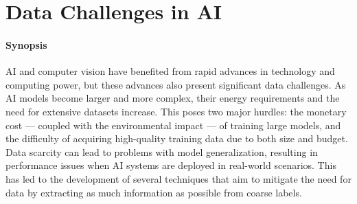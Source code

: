 \graphicspath{{ch1_introduction/}{Figures/}}

\chapter{Data Challenges in AI}
\label{chapter:introduction}







\subsubsection{Synopsis}AI and computer vision have benefited from rapid advances in technology and computing power, but these advances also present significant data challenges. As AI models become larger and more complex, their energy requirements and the need for extensive datasets increase. This poses two major hurdles: the monetary cost --- coupled with the environmental impact --- of training large models, and the difficulty of acquiring high-quality training data due to both size and budget. Data scarcity can lead to problems with model generalization, resulting in performance issues when AI systems are deployed in real-world scenarios. This has led to the development of several techniques that aim to mitigate the need for data by extracting as much information as possible from coarse labels.





